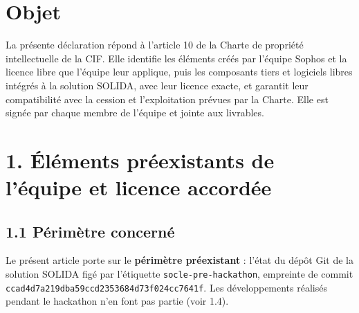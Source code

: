 \documentclass[11pt,a4paper]{article}
\begin{document}
\begin{center}
\end{center}

\vspace{0.6em}

\section*{Objet}

La présente déclaration répond à l'article 10 de la Charte de propriété intellectuelle de la CIF.
Elle identifie les éléments créés par l'équipe Sophos et la licence libre que l'équipe leur
applique, puis les composants tiers et logiciels libres intégrés à la solution SOLIDA, avec leur
licence exacte, et garantit leur compatibilité avec la cession et l'exploitation prévues par la
Charte. Elle est signée par chaque membre de l'équipe et jointe aux livrables.

\section*{1. Éléments préexistants de l'équipe et licence accordée}

\subsection*{1.1 Périmètre concerné}

Le présent article porte sur le \textbf{périmètre préexistant} : l'état du dépôt Git de la solution
SOLIDA figé par l'étiquette \texttt{socle-pre-hackathon}, empreinte de commit
\texttt{ccad4d7a219dba59ccd2353684d73f024cc7641f}. Les développements réalisés pendant le
hackathon n'en font pas partie (voir 1.4).
\end{document}
